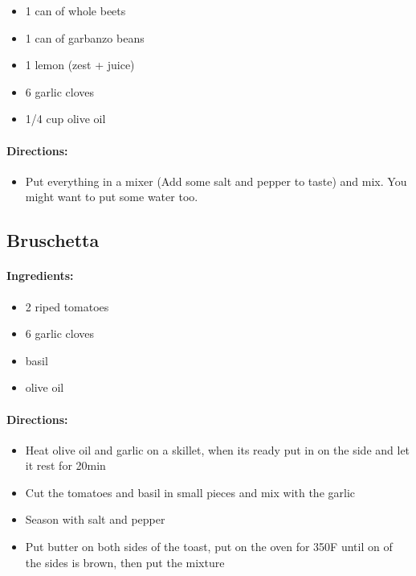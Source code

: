 \documentclass{article}
\begin{document}
\begin{itemize}
	\item 1 can of whole beets
	\item 1 can of garbanzo beans
	\item 1 lemon (zest + juice)
	\item 6 garlic cloves
	\item 1/4 cup olive oil
\end{itemize}

\paragraph{Directions:}

\begin{itemize}
	\item Put everything in a mixer (Add some salt and pepper to taste) and mix. You might want to put some water too.
\end{itemize}

\subsection{Bruschetta}

\paragraph{Ingredients:}

\begin{itemize}
	\item 2 riped tomatoes
	\item 6 garlic cloves
	\item basil
	\item olive oil
\end{itemize}

\paragraph{Directions:}
\begin{itemize}
	\item Heat olive oil and garlic on a skillet, when its ready put in on the side and let it rest for 20min
	\item Cut the tomatoes and basil in small pieces and mix with the garlic
	\item Season with salt and pepper
	\item Put butter on both sides of the toast, put on the oven for 350F until on of the sides is brown, then put the mixture
\end{itemize}
\end{document}
